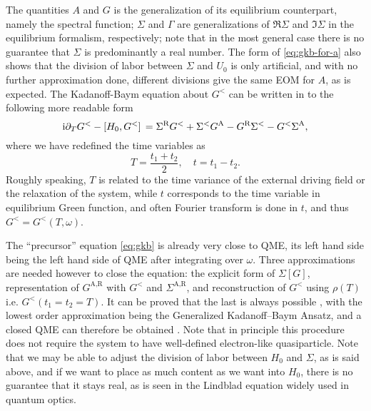 \documentclass[hyperref, a4paper]{article}
\newcommand*{\ii}{\mathrm{i}}
\begin{document}
The quantities $A$ and $G$  
is the generalization of its equilibrium counterpart, 
namely the spectral function;
$\Sigma$ and $\Gamma$ are generalizations of 
$\Re \Sigma$ and $\Im \Sigma$ in the equilibrium formalism, respectively;
note that in the most general case 
there is no guarantee that $\Sigma$ is predominantly a real number.
The form of \eqref{eq:gkb-for-a} also shows 
that the division of labor between $\Sigma$ and $U_0$
is only artificial, 
and with no further approximation done, 
different divisions give the same EOM for $A$,
as is expected.
The Kadanoff-Baym equation about $G^<$ can be written in to the following more readable form
\begin{equation}
    \ii \partial_T G^< - \comm*{H_0}{G^<} = 
    \Sigma^{\text{R}} G^< + \Sigma^< G^{\text{A}} - G^{\text{R}} \Sigma^< - G^< \Sigma^{\text{A}},
    \label{eq:gkb}
\end{equation}
where we have redefined the time variables as 
\begin{equation}
    T = \frac{t_1 + t_2}{2}, \quad t = t_1 - t_2.
\end{equation}
Roughly speaking, $T$ is related to the time variance 
of the external driving field or the relaxation of the system,
while $t$ corresponds to the time variable 
in equilibrium Green function,
and often Fourier transform is done in $t$,
and thus $G^< = G^<(T, \omega)$. 


The ``precursor'' equation \eqref{eq:gkb} is already very close to QME,
its left hand side being the left hand side of QME 
after integrating over $\omega$.
Three approximations are needed however to close the equation:
the explicit form of $\Sigma[G]$,
representation of $G^{\text{A}, \text{R}}$ with $G^<$ and $\Sigma^{\text{A}, \text{R}}$,
and reconstruction of $G^<$ using $\rho(T)$ i.e. $G^<(t_1 = t_2 = T)$.
It can be proved that the last is always possible \cite{vspivcka2005long},
with the lowest order approximation being the 
Generalized Kadanoff–Baym Ansatz,
and a closed QME can therefore be obtained \cite{vspivcka2005long2,haug2008quantum}.
Note that in principle this procedure does not require 
the system to have well-defined electron-like quasiparticle.
Note that we may be able to adjust the division of labor between $H_0$ and $\Sigma$,
as is said above, and 
if we want to place as much content as we want into $H_0$,
there is no guarantee that it stays real,
as is seen in the Lindblad equation 
widely used in quantum optics.
\end{document}
